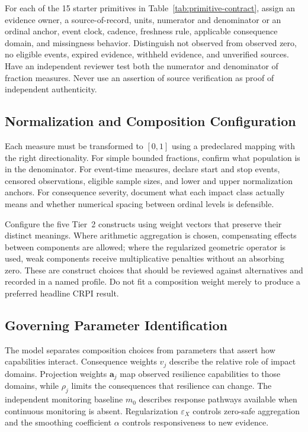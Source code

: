 \documentclass[11pt]{article}
\begin{document}
For each of the 15 starter primitives in
Table~\ref{tab:primitive-contract}, assign an evidence owner,
a source-of-record, units, numerator and denominator or an
ordinal anchor, event clock, cadence, freshness rule, applicable
consequence domain, and missingness behavior. Distinguish
not observed from observed zero, no eligible events, expired
evidence, withheld evidence, and unverified sources. Have an
independent reviewer test both the numerator and denominator
of fraction measures. Never use an assertion of source
verification as proof of independent authenticity.

\subsection{Normalization and Composition Configuration}
Each measure must be transformed to $[0,1]$ using a
predeclared mapping with the right directionality.
For simple bounded fractions, confirm what population is
in the denominator. For event-time measures, declare
start and stop events, censored observations, eligible
sample sizes, and lower and upper normalization anchors.
For consequence severity, document what each impact
class actually means and whether numerical spacing
between ordinal levels is defensible.

Configure the five Tier~2 constructs using weight vectors
that preserve their distinct meanings. Where arithmetic
aggregation is chosen, compensating effects between
components are allowed; where the regularized geometric
operator is used, weak components receive multiplicative
penalties without an absorbing zero. These are construct
choices that should be reviewed against alternatives and
recorded in a named profile. Do not fit a composition
weight merely to produce a preferred headline CRPI result.

\subsection{Governing Parameter Identification}
The model separates composition choices from parameters
that assert how capabilities interact. Consequence weights
$v_j$ describe the relative role of impact domains.
Projection weights $\mathbf{a}_j$ map observed resilience
capabilities to those domains, while $\rho_j$ limits the
consequences that resilience can change. The independent
monitoring baseline $m_0$ describes response pathways
available when continuous monitoring is absent.
Regularization $\varepsilon_X$ controls zero-safe
aggregation and the smoothing coefficient $\alpha$
controls responsiveness to new evidence.
\end{document}
